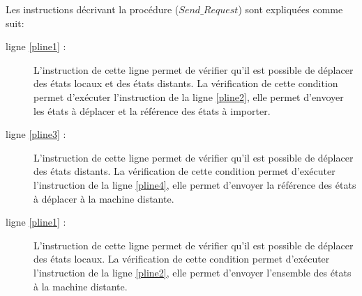 
\begin{procedure} [h]
	\setcounter{AlgoLine}{0}
\caption{$Send\_ Request(MG:state,MF:state)$}
\end{procedure}
Les instructions décrivant la procédure ($Send\_ Request$) sont expliquées comme suit:
\begin{description}
\item[ligne \ref{pline1} :] L'instruction de cette ligne permet de vérifier qu'il est possible de déplacer des états locaux et des états distants. La vérification de cette condition permet d'exécuter l'instruction de la ligne \ref{pline2}, elle permet d'envoyer les états à déplacer et la référence des états à importer. 
\item[ligne \ref{pline3} :] L'instruction de cette ligne permet de vérifier qu'il est possible de déplacer des états distants. La vérification de cette condition permet d'exécuter l'instruction de la ligne \ref{pline4}, elle permet d'envoyer la référence des états à déplacer à la machine distante. 
\item[ligne \ref{pline1} :] L'instruction de cette ligne permet de vérifier qu'il est possible de déplacer des états locaux. La vérification de cette condition permet d'exécuter l'instruction de la ligne \ref{pline2}, elle permet d'envoyer l'ensemble des états à la machine distante. 
\end{description}

\begin{function}
	\setcounter{AlgoLine}{0}
\caption{$element(s:state)$}
\end{function}

